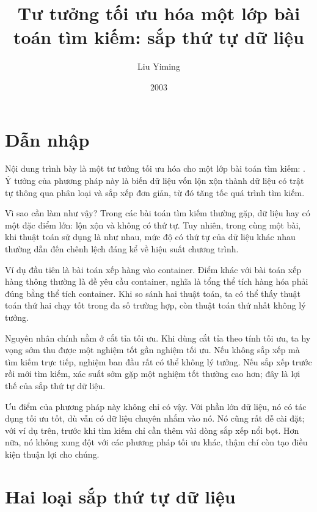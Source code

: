 \documentclass[11pt]{article}
\title{Tư tưởng tối ưu hóa một lớp bài toán tìm kiếm: sắp thứ tự dữ liệu}
\author{Liu Yiming}
\date{2003}
\begin{document}
\maketitle


\section{Dẫn nhập}

Nội dung trình bày là một tư tưởng tối ưu hóa cho một lớp bài toán tìm kiếm:
. Ý tưởng của phương pháp này là biến dữ liệu vốn
lộn xộn thành dữ liệu có trật tự thông qua phân loại và sắp xếp đơn giản, từ
đó tăng tốc quá trình tìm kiếm.

Vì sao cần làm như vậy? Trong các bài toán tìm kiếm thường gặp, dữ liệu hay có
một đặc điểm lớn: lộn xộn và không có thứ tự. Tuy nhiên, trong cùng một bài,
khi thuật toán sử dụng là như nhau, mức độ có thứ tự của dữ liệu khác nhau
thường dẫn đến chênh lệch đáng kể về hiệu suất chương trình.

Ví dụ đầu tiên là bài toán xếp hàng vào container. Điểm khác với bài toán xếp
hàng thông thường là đề yêu cầu  container, nghĩa là tổng thể
tích hàng hóa phải đúng bằng thể tích container. Khi so sánh hai thuật toán,
ta có thể thấy thuật toán thứ hai chạy tốt trong đa số trường hợp, còn thuật
toán thứ nhất không lý tưởng.

Nguyên nhân chính nằm ở cắt tỉa tối ưu. Khi dùng cắt tỉa theo tính tối ưu, ta
hy vọng sớm thu được một nghiệm tốt gần nghiệm tối ưu. Nếu không sắp xếp mà
tìm kiếm trực tiếp, nghiệm ban đầu rất có thể không lý tưởng. Nếu sắp xếp
trước rồi mới tìm kiếm, xác suất sớm gặp một nghiệm tốt thường cao hơn; đây là
lợi thế của sắp thứ tự dữ liệu.

Ưu điểm của phương pháp này không chỉ có vậy. Với phần lớn dữ liệu, nó có tác
dụng tối ưu tốt, dù vẫn có dữ liệu chuyên nhắm vào nó. Nó cũng rất dễ cài đặt;
với ví dụ trên, trước khi tìm kiếm chỉ cần thêm vài dòng sắp xếp nổi bọt. Hơn
nữa, nó không xung đột với các phương pháp tối ưu khác, thậm chí còn tạo điều
kiện thuận lợi cho chúng.

\section{Hai loại sắp thứ tự dữ liệu}
\end{document}
